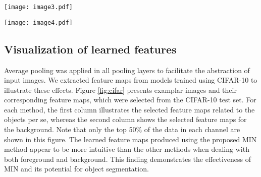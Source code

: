\documentclass[10pt,twocolumn,letterpaper]{article}
\begin{document}
\begin{figure*}
\begin{center}
	\texttt{[image: image3.pdf]}
\end{center}
   \caption{Visualization of learned feature maps before the first pooling layer obtained using the MIN, MIM, and NIN methods. Only the top 50\% of the data in each channel are presented.}
\label{fig:cifar}
\end{figure*}


\begin{figure*}
\begin{center}
	\texttt{[image: image4.pdf]}
\end{center}
   \caption{Visualization of the learned feature maps before the global average pooling layer obtained using the MIN and NIN methods. Only the top 10\% of the data are presented. The first and second candidates of the output are highlighted in red and green boxes. These results demonstrate the possibility applying the proposed MIN method to multiple object recognition.}
\label{fig:svhn}
\end{figure*}

\subsection{Visualization of learned features}
 Average pooling was applied in all pooling layers to facilitate the abstraction of input images. We extracted feature maps from models trained using CIFAR-10 to illustrate these effects. Figure \ref{fig:cifar} presents examplar images and their corresponding feature maps, which were selected from the CIFAR-10 test set. For each method, the first column illustrates the selected feature maps related to the objects per se, whereas the second column shows the selected feature maps for the background.  Note that only the top 50\% of the data in each channel are shown in this figure. The learned feature maps produced using the proposed MIN method appear to be more intuitive than the other methods when dealing with both foreground and background. This finding demonstrates the effectiveness of MIN and its potential for object segmentation.
\end{document}
